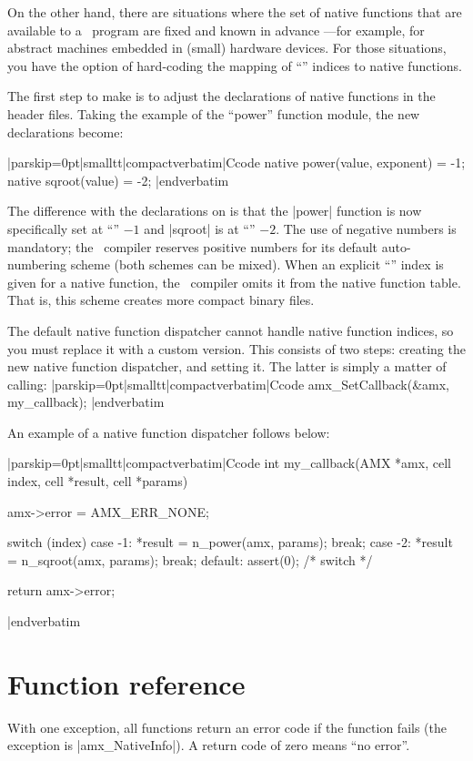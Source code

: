 On the other hand, there are situations where the set of native functions
that are available to a \Small\ program are fixed and known in advance ---for
example, for abstract machines embedded in (small) hardware devices. For those
situations, you have the option of hard-coding the mapping of ``''
indices to native functions.

The first step to make is to adjust the declarations of native functions in the
header files. Taking the example of the ``power'' function module, the new
declarations become:

\goodbreak
\listingx\verbatim|parskip=0pt|smalltt|compactverbatim|Ccode
native power(value, exponent) = -1;
native sqroot(value)          = -2;
|endverbatim\endlistingx

The difference with the declarations on  is that the
|power| function is now specifically set at ``'' $-1$ and
|sqroot| is at ``'' $-2$. The use of negative numbers is
mandatory; the \Small\ compiler reserves positive numbers for its default
auto-numbering scheme (both schemes can be mixed). When an explicit ``''
index is given for a native function, the \Small\ compiler omits it from the
native function table. That is, this scheme creates more compact binary files.

The default native function dispatcher cannot handle native function indices, so
you must replace it with a custom version. This consists of two steps: creating
the new native function dispatcher, and setting it. The latter is simply a matter
of calling:
\verbatim|parskip=0pt|smalltt|compactverbatim|Ccode
    amx_SetCallback(&amx, my_callback);
|endverbatim

An example of a native function dispatcher follows below:

\goodbreak
\listingx\verbatim|parskip=0pt|smalltt|compactverbatim|Ccode
int my_callback(AMX *amx, cell index, cell *result, cell *params)
{
  amx->error = AMX_ERR_NONE;

  switch (index) {
  case -1:
    *result = n_power(amx, params);
    break;
  case -2:
    *result = n_sqroot(amx, params);
    break;
  default:
    assert(0);
  } /* switch */

  return amx->error;
}
|endverbatim\endlistingx


\vfill\eject
{}%

\section{Function reference}
\noindent{}%
With one exception, all functions return an error code if the function fails
(the exception is |amx_NativeInfo|). A return code of zero means ``no error''.


